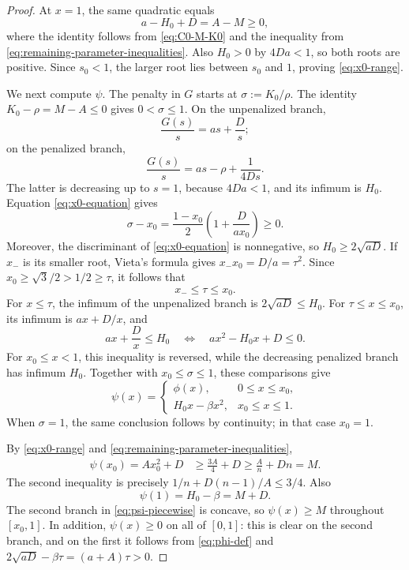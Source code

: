 \documentclass[11pt]{article}
\theoremstyle{remark}
\begin{document}
\begin{proof}
At $x=1$, the same quadratic equals
\[
 a-H_0+D=A-M\geq0,
\]
where the identity follows from \eqref{eq:C0-M-K0} and the inequality
from \eqref{eq:remaining-parameter-inequalities}.  Also
$H_0>0$ by $4Da<1$, so both roots are positive.  Since
$s_0<1$, the larger root lies between $s_0$ and $1$, proving
\eqref{eq:x0-range}.

We next compute $\psi$.  The penalty in $G$ starts at
$\sigma:=K_0/\rho$.  The identity $K_0-\rho=M-A\leq0$ gives
$0<\sigma\leq1$.  On the unpenalized branch,
\[
 \frac{G(s)}s=as+\frac Ds;
\]
on the penalized branch,
\[
 \frac{G(s)}s=as-\rho+\frac1{4Ds}.
\]
The latter is decreasing up to $s=1$, because $4Da<1$, and its
infimum is $H_0$.  Equation \eqref{eq:x0-equation} gives
\begin{equation}\label{eq:sigma-x0}
 \sigma-x_0=\frac{1-x_0}{2}
       \left(1+\frac{D}{ax_0}\right)\geq0.
\end{equation}
Moreover, the discriminant of \eqref{eq:x0-equation} is nonnegative, so
\(H_0\geq2\sqrt{aD}\).  If \(x_-\) is its smaller root, Vieta's
formula gives $x_-x_0=D/a=\tau^2$.  Since
$x_0\geq\sqrt3/2>1/2\geq\tau$, it follows that
\[
 x_-\leq\tau\leq x_0.
\]
For \(x\leq\tau\), the infimum of the unpenalized branch is
\(2\sqrt{aD}\leq H_0\).  For \(\tau\leq x\leq x_0\), its infimum is
\(ax+D/x\), and
\[
 ax+\frac Dx\leq H_0
 \quad\Longleftrightarrow\quad ax^2-H_0x+D\leq0.
\]
For \(x_0\leq x<1\), this inequality is reversed, while the decreasing
penalized branch has infimum \(H_0\).  Together with
\(x_0\leq\sigma\leq1\), these comparisons give
\begin{equation}\label{eq:psi-piecewise}
 \psi(x)=
 \begin{cases}
 \phi(x),&0\leq x\leq x_0,\\
 H_0x-\beta x^2,&x_0\leq x\leq1.
 \end{cases}
\end{equation}
When $\sigma=1$, the same conclusion follows by continuity; in that
case $x_0=1$.

By \eqref{eq:x0-range} and
\eqref{eq:remaining-parameter-inequalities},
\begin{align}
 \psi(x_0)=Ax_0^2+D
 &\geq \frac{3A}{4}+D
 \geq \frac An+Dn=M.\label{eq:psi-x0-lower}
\end{align}
The second inequality is precisely
$1/n+D(n-1)/A\leq3/4$.  Also
\begin{equation}\label{eq:psi-one}
 \psi(1)=H_0-\beta=M+D.
\end{equation}
The second branch in \eqref{eq:psi-piecewise} is concave, so
$\psi(x)\geq M$ throughout $[x_0,1]$.  In addition,
$\psi(x)\geq0$ on all of $[0,1]$: this is clear on the second branch,
and on the first it follows from \eqref{eq:phi-def} and
$2\sqrt{aD}-\beta\tau=(a+A)\tau>0$.


\end{proof}
\end{document}
